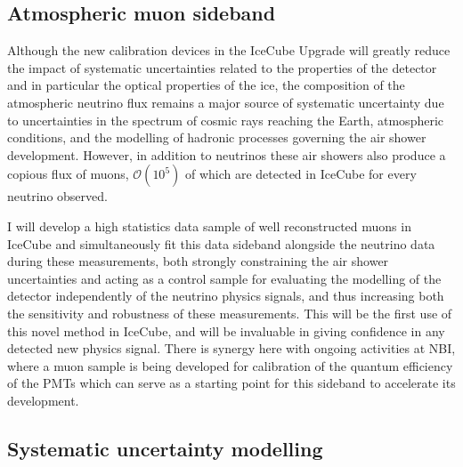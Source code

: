 \documentclass[a4paper,11pt]{article}
\begin{document}



\subsection{Atmospheric muon sideband}

Although the new calibration devices in the IceCube Upgrade will greatly reduce the impact of systematic uncertainties related to the properties of the detector and in particular the optical properties of the ice, the composition of the atmospheric neutrino flux remains a major source of systematic uncertainty due to uncertainties in the spectrum of cosmic rays reaching the Earth, atmospheric conditions, and the modelling of hadronic processes governing the air shower development. However, in addition to neutrinos these air showers also produce a copious flux of muons, $\mathcal{O}(10^5)$ of which are detected in IceCube for every neutrino observed. 

I will develop a high statistics data sample of well reconstructed muons in IceCube and simultaneously fit this data sideband alongside the neutrino data during these measurements, both strongly constraining the air shower uncertainties and acting as a control sample for evaluating the modelling of the detector independently of the neutrino physics signals, and thus increasing both the sensitivity and robustness of these measurements. This will be the first use of this novel method in IceCube, and will be invaluable in giving confidence in any detected new physics signal. There is synergy here with ongoing activities at NBI, where a muon sample is being developed for calibration of the quantum efficiency of the PMTs which can serve as a starting point for this sideband to accelerate its development.  \\



\subsection{Systematic uncertainty modelling}
\end{document}
